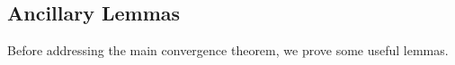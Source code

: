 \documentclass{article}
\theoremstyle{remark}
\theoremstyle{definition}
\DeclareMathOperator*{\EV}{\mathbb{E}}
\DeclareMathOperator*{\Var}{\mathbb{V}ar}
\newcommand{\EVV}[2][\ppvect \in \ppspace]{\EV_{#1}\left[{#2}\right]}
\newcommand{\vtheta}{\boldsymbol{\theta}}
\newcommand{\gradJ}[1]{\nabla J(#1)}
\newcommand{\gradApp}[2]{\widehat{\nabla}_{#2}J(#1)}
\newcommand{\gradBlack}[1]{\blacktriangledown J(#1)}
\newcommand{\wt}[1]{\widetilde{#1}}
\begin{document}
%
%

\subsection*{Ancillary Lemmas}
Before addressing the main convergence theorem, we prove some useful lemmas.
\end{document}

